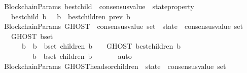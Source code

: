 \begin{isabellebody}
%
\isadelimproof
\isanewline
%
\endisadelimproof
\isanewline
\isanewline
{}\isamarkupfalse%
\ {\isacharparenleft}\ BlockchainParams{\isacharparenright}\ best{\isacharunderscore}child\ {\isacharcolon}{\isacharcolon}\ {\isachardoublequoteopen}consensus{\isacharunderscore}value\ {\isasymRightarrow}\ state{\isacharunderscore}property{\isachardoublequoteclose}\isanewline
\ \ \isanewline
\ \ \ \ {\isachardoublequoteopen}best{\isacharunderscore}child\ b\ {\isacharequal}\ {\isacharparenleft}{\isasymlambda}{\isasymsigma}{\isachardot}\ b\ {\isasymin}\ best{\isacharunderscore}children\ {\isacharparenleft}prev\ b{\isacharcomma}\ {\isasymsigma}{\isacharparenright}{\isacharparenright}{\isachardoublequoteclose}\isanewline
\isanewline
\isanewline
\isanewline
{}\isamarkupfalse%
\ {\isacharparenleft}\ BlockchainParams{\isacharparenright}\ GHOST\ {\isacharcolon}{\isacharcolon}\ {\isachardoublequoteopen}{\isacharparenleft}consensus{\isacharunderscore}value\ set\ {\isacharasterisk}\ state{\isacharparenright}\ {\isasymRightarrow}\ consensus{\isacharunderscore}value\ set{\isachardoublequoteclose}\isanewline
\ \ \isanewline
\ \ \ \ {\isachardoublequoteopen}GHOST\ {\isacharparenleft}b{\isacharunderscore}set{\isacharcomma}\ {\isasymsigma}{\isacharparenright}\ {\isacharequal}\isanewline
\ \ \ \ \ \ {\isacharparenleft}{\isasymUnion}\ b\ {\isasymin}\ {\isacharbraceleft}b\ {\isasymin}\ b{\isacharunderscore}set{\isachardot}\ children\ {\isacharparenleft}b{\isacharcomma}\ {\isasymsigma}{\isacharparenright}\ {\isasymnoteq}\ {\isasymemptyset}{\isacharbraceright}{\isachardot}\ GHOST\ {\isacharparenleft}best{\isacharunderscore}children\ {\isacharparenleft}b{\isacharcomma}\ {\isasymsigma}{\isacharparenright}{\isacharcomma}\ {\isasymsigma}{\isacharparenright}{\isacharparenright}\isanewline
\ \ \ \ \ \ \ \ \ {\isasymunion}\ {\isacharbraceleft}b\ {\isasymin}\ b{\isacharunderscore}set{\isachardot}\ children\ {\isacharparenleft}b{\isacharcomma}\ {\isasymsigma}{\isacharparenright}\ {\isacharequal}\ {\isasymemptyset}{\isacharbraceright}{\isachardoublequoteclose}\isanewline
%
\isadelimproof
\ \ %
\endisadelimproof
%
\isatagproof
{}\isamarkupfalse%
\ auto%
\endisatagproof
{\isafoldproof}%
%
\isadelimproof
\isanewline
%
\endisadelimproof
\isanewline
{}\isamarkupfalse%
\ {\isacharparenleft}\ BlockchainParams{\isacharparenright}\ GHOST{\isacharunderscore}heads{\isacharunderscore}or{\isacharunderscore}children\ {\isacharcolon}{\isacharcolon}\ {\isachardoublequoteopen}state\ {\isasymRightarrow}\ consensus{\isacharunderscore}value\ set{\isachardoublequoteclose}\isanewline

\end{isabellebody}
